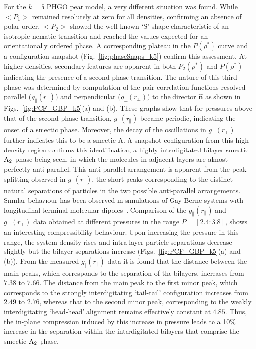 \documentclass[%
reprint,
superscriptaddress,
showpacs,
 amsmath,amssymb,
 aps,
floatfix,
]{revtex4-1}
\newcommand{\vecth}[1]{ \mathbf{\hat{#1} } }
\begin{document}
For the $k=5$ PHGO pear model, a very different situation was
found. While $<P_1>$ remained resolutely at zero for all
densities, confirming an absence of polar order, $<P_2>$ showed
the well known `S' shape characteristic of an isotropic-nematic
transition and reached the values expected for an orientationally
ordered phase. A corresponding plateau in the $P(\rho^{*})$ curve
and a configuration snapshot (Fig.~\ref{fig:phaseSnaps_k5})
confirm this assessment. At higher densities, secondary features
are apparent in both $P_2(\rho^{*})$ and $P(\rho^{*})$ indicating
the presence of a second phase transition. The nature of this
third phase was determined by computation of the pair correlation
functions resolved parallel ($g_\parallel(r_\parallel)$) and
perpendicular ($g_\perp(r_\perp)$) to the director $\vecth{n}$ as
shown in Figs.~\ref{fig:PCF_GBP_k5}(a) and (b). These graphs show
that for pressures above that of the second phase transition,
$g_\parallel(r_\parallel)$ became periodic, indicating the onset
of a smectic phase. Moreover, the decay of the oscillations in
$g_\perp(r_\perp)$ further indicates this to be a smectic A. A
snapshot configuration from this high density region confirms this
identification, a highly interdigitated bilayer smectic ${\rm
A_2}$ phase being seen, in which the molecules in adjacent layers
are almost perfectly anti-parallel. This anti-parallel arrangement
is apparent from the peak splitting observed in
$g_\parallel(r_\parallel)$, the short peaks corresponding to the
distinct natural separations of particles in the two possible
anti-parallel arrangements. Similar behaviour has been observed in
simulations of Gay-Berne systems with longitudinal terminal
molecular dipoles~\cite{BerardiOrlandi03}.
Comparison of
the $g_\parallel(r_\parallel)$ and $g_\perp(r_\perp)$ data
obtained at different pressures in the range $P=[2.4:3.8]$, shows
an interesting compressibility behaviour. Upon increasing the
pressure in this range, the system density rises and intra-layer
particle separations decrease slightly but the bilayer separations
increase (Figs.~\ref{fig:PCF_GBP_k5}(a) and (b)). From the
measured $g_\parallel(r_\parallel)$ data it is found that the
distance between the main peaks, which corresponds to the
separation of the bilayers, increases from $7.38$ to $7.66$. The
distance from the main peak to the first minor peak, which
corresponds to the strongly interdigitating `tail-tail'
configuration increases from $2.49$ to $2.76$, whereas that to the
second minor peak, corresponding to the weakly interdigitating
`head-head' alignment remains effectively constant at $4.85$.
Thus, the in-plane compression induced by this increase in
pressure leads to a 10\% increase in the separation within the
interdigitated bilayers that comprise the smectic ${\rm A_2}$
phase.
\end{document}
